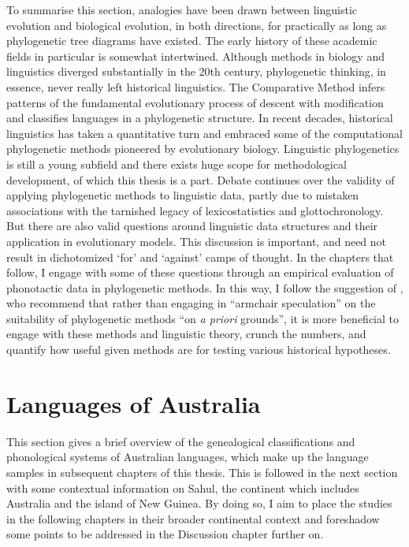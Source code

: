 To summarise this section, analogies have been drawn between linguistic evolution and biological evolution, in both directions, for practically as long as phylogenetic tree diagrams have existed. The early history of these academic fields in particular is somewhat intertwined. Although methods in biology and linguistics diverged substantially in the 20th century, phylogenetic thinking, in essence, never really left historical linguistics. The Comparative Method infers patterns of the fundamental evolutionary process of descent with modification and classifies languages in a phylogenetic structure. In recent decades, historical linguistics has taken a quantitative turn and embraced some of the computational phylogenetic methods pioneered by evolutionary biology. Linguistic phylogenetics is still a young subfield and there exists huge scope for methodological development, of which this thesis is a part. Debate continues over the validity of applying phylogenetic methods to linguistic data, partly due to mistaken associations with the tarnished legacy of lexicostatistics and glottochronology. But there are also valid questions around linguistic data structures and their application in evolutionary models. This discussion is important, and need not result in dichotomized `for' and `against' camps of thought. In the chapters that follow, I engage with some of these questions through an empirical evaluation of phonotactic data in phylogenetic methods. In this way, I follow the suggestion of \textcite[p.~2299]{greenhill_does_2009}, who recommend that rather than engaging in ``armchair speculation'' on the suitability of phylogenetic methods ``on \emph{a priori} grounds'', it is more beneficial to engage with these methods and linguistic theory, crunch the numbers, and quantify how useful given methods are for testing various historical hypotheses.

\hypertarget{languages-of-australia}{%
\section{Languages of Australia}\label{languages-of-australia}}

This section gives a brief overview of the genealogical classifications and phonological systems of Australian languages, which make up the language samples in subsequent chapters of this thesis. This is followed in the next section with some contextual information on Sahul, the continent which includes Australia and the island of New Guinea. By doing so, I aim to place the studies in the following chapters in their broader continental context and foreshadow some points to be addressed in the Discussion chapter further on.

